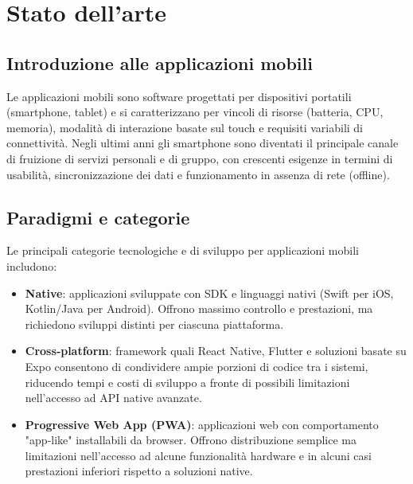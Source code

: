 \chapter{Stato dell'arte}
\label{chap:stato_arte}

\section{Introduzione alle applicazioni mobili}
Le applicazioni mobili sono software progettati per dispositivi portatili (smartphone, tablet) e si caratterizzano per vincoli di risorse (batteria, CPU, memoria), modalità di interazione basate sul touch e requisiti variabili di connettività. Negli ultimi anni gli smartphone sono diventati il principale canale di fruizione di servizi personali e di gruppo, con crescenti esigenze in termini di usabilità, sincronizzazione dei dati e funzionamento in assenza di rete (offline).

\section{Paradigmi e categorie}
Le principali categorie tecnologiche e di sviluppo per applicazioni mobili includono:

\begin{itemize}
  \item \textbf{Native}: applicazioni sviluppate con SDK e linguaggi nativi (Swift per iOS, Kotlin/Java per Android). Offrono massimo controllo e prestazioni, ma richiedono sviluppi distinti per ciascuna piattaforma.
  \item \textbf{Cross‑platform}: framework quali React Native, Flutter e soluzioni basate su Expo consentono di condividere ampie porzioni di codice tra i sistemi, riducendo tempi e costi di sviluppo a fronte di possibili limitazioni nell'accesso ad API native avanzate.
  \item \textbf{Progressive Web App (PWA)}: applicazioni web con comportamento "app‑like" installabili da browser. Offrono distribuzione semplice ma limitazioni nell'accesso ad alcune funzionalità hardware e in alcuni casi prestazioni inferiori rispetto a soluzioni native.
\end{itemize}

